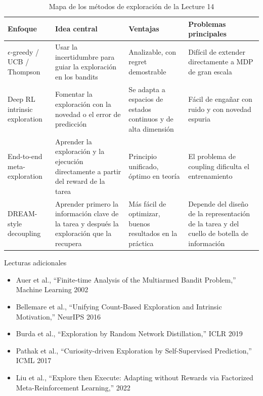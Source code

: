 \begin{table}[H]
\centering
\begin{tabular}{p{} p{} p{} p{}}
\toprule
Enfoque & Idea central & Ventajas & Problemas principales \\
\midrule
$\epsilon$-greedy / UCB / Thompson & Usar la incertidumbre para guiar la exploración en los bandits & Analizable, con regret demostrable & Difícil de extender directamente a MDP de gran escala \\
Deep RL intrinsic exploration & Fomentar la exploración con la novedad o el error de predicción & Se adapta a espacios de estados continuos y de alta dimensión & Fácil de engañar con ruido y con novedad espuria \\
End-to-end meta-exploration & Aprender la exploración y la ejecución directamente a partir del reward de la tarea & Principio unificado, óptimo en teoría & El problema de coupling dificulta el entrenamiento \\
DREAM-style decoupling & Aprender primero la información clave de la tarea y después la exploración que la recupera & Más fácil de optimizar, buenos resultados en la práctica & Depende del diseño de la representación de la tarea y del cuello de botella de información \\
\bottomrule
\end{tabular}
\caption{Mapa de los métodos de exploración de la Lecture 14}
\end{table}

\begin{knowledgebox}{Lecturas adicionales}
\begin{itemize}
    \item Auer et al., ``Finite-time Analysis of the Multiarmed Bandit Problem,'' Machine Learning 2002
    \item Bellemare et al., ``Unifying Count-Based Exploration and Intrinsic Motivation,'' NeurIPS 2016
    \item Burda et al., ``Exploration by Random Network Distillation,'' ICLR 2019
    \item Pathak et al., ``Curiosity-driven Exploration by Self-Supervised Prediction,'' ICML 2017
    \item Liu et al., ``Explore then Execute: Adapting without Rewards via Factorized Meta-Reinforcement Learning,'' 2022
\end{itemize}
\end{knowledgebox}


